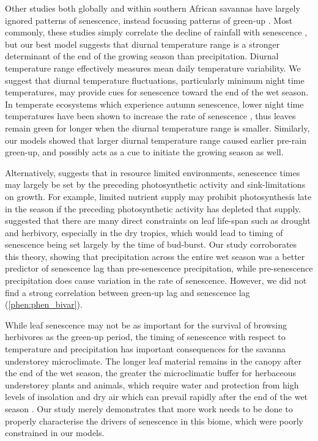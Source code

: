 \begin{refsection}
Other studies both globally and within southern African savannas have largely ignored patterns of senescence, instead focussing patterns of green-up \citep{Gallinat2015}. Most commonly, these studies simply correlate the decline of rainfall with senescence \citep{Guan2014}, but our best model suggests that diurnal temperature range is a stronger determinant of the end of the growing season than precipitation. Diurnal temperature range effectively measures mean daily temperature variability. We suggest that diurnal temperature fluctuations, particularly minimum night time temperatures, may provide cues for senescence toward the end of the wet season. In temperate ecosystems which experience autumn senescence, lower night time temperatures have been shown to increase the rate of senescence \citep{Michelson2017, Escamilla2020}, thus leaves remain green for longer when the diurnal temperature range is smaller. Similarly, our models showed that larger diurnal temperature range caused earlier pre-rain green-up, and possibly acts as a cue to initiate the growing season as well.

Alternatively, \citet{Zani2020} suggests that in resource limited environments, senescence times may largely be set by the preceding photosynthetic activity and sink-limitations on growth. For example, limited nutrient supply may prohibit photosynthesis late in the season if the preceding photosynthetic activity has depleted that supply. \citet{Reich1992} suggested that there are many direct constraints on leaf life-span such as drought and herbivory, especially in the dry tropics, which would lead to timing of senescence being set largely by the time of bud-burst. Our study corroborates this theory, showing that precipitation across the entire wet season was a better predictor of senescence lag than pre-senescence precipitation, while pre-senescence precipitation does cause variation in the rate of senescence. However, we did not find a strong correlation between green-up lag and senescence lag (\autoref{phen:phen_bivar}).

While leaf senescence may not be as important for the survival of browsing herbivores as the green-up period, the timing of senescence with respect to temperature and precipitation has important consequences for the savanna understorey microclimate. The longer leaf material remains in the canopy after the end of the wet season, the greater the microclimatic buffer for herbaceous understorey plants and animals, which require water and protection from high levels of insolation and dry air which can prevail rapidly after the end of the wet season \citep{Guan2014}. Our study merely demonstrates that more work needs to be done to properly characterise the drivers of senescence in this biome, which were poorly constrained in our models.


\end{refsection}
